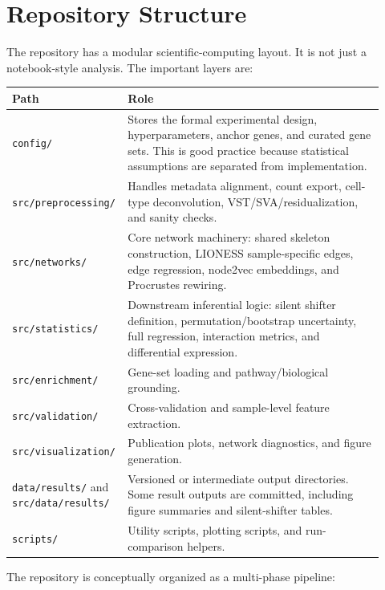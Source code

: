 \documentclass[11pt]{article}
\begin{document}
\section{Repository Structure}

The repository has a modular scientific-computing layout.  It is not just a notebook-style analysis.  The important layers are:

\begin{longtable}{p{0.24\linewidth} p{0.68\linewidth}}
\toprule
\textbf{Path} & \textbf{Role} \\
\midrule
\texttt{config/} & Stores the formal experimental design, hyperparameters, anchor genes, and curated gene sets.  This is good practice because statistical assumptions are separated from implementation. \\
\texttt{src/preprocessing/} & Handles metadata alignment, count export, cell-type deconvolution, VST/SVA/residualization, and sanity checks. \\
\texttt{src/networks/} & Core network machinery: shared skeleton construction, LIONESS sample-specific edges, edge regression, node2vec embeddings, and Procrustes rewiring. \\
\texttt{src/statistics/} & Downstream inferential logic: silent shifter definition, permutation/bootstrap uncertainty, full regression, interaction metrics, and differential expression. \\
\texttt{src/enrichment/} & Gene-set loading and pathway/biological grounding. \\
\texttt{src/validation/} & Cross-validation and sample-level feature extraction. \\
\texttt{src/visualization/} & Publication plots, network diagnostics, and figure generation. \\
\texttt{data/results/} and \texttt{src/data/results/} & Versioned or intermediate output directories.  Some result outputs are committed, including figure summaries and silent-shifter tables. \\
\texttt{scripts/} & Utility scripts, plotting scripts, and run-comparison helpers. \\
\bottomrule
\end{longtable}

The repository is conceptually organized as a multi-phase pipeline:
\end{document}
